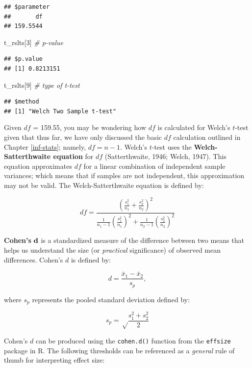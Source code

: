 \documentclass[]{book}
\newenvironment{Shaded}{\begin{snugshade}}{\end{snugshade}}
\newcommand{\CommentTok}[1]{\textcolor[rgb]{0.56,0.35,0.01}{\textit{#1}}}
\newcommand{\DecValTok}[1]{\textcolor[rgb]{0.00,0.00,0.81}{#1}}
\newcommand{\NormalTok}[1]{#1}
\begin{document}
\begin{verbatim}
## $parameter
##       df 
## 159.5544
\end{verbatim}

\begin{Shaded}
\begin{Highlighting}[]
\NormalTok{t_rslts[}\DecValTok{3}\NormalTok{] }\CommentTok{# p-value}
\end{Highlighting}
\end{Shaded}

\begin{verbatim}
## $p.value
## [1] 0.8213151
\end{verbatim}

\begin{Shaded}
\begin{Highlighting}[]
\NormalTok{t_rslts[}\DecValTok{9}\NormalTok{] }\CommentTok{# type of t-test}
\end{Highlighting}
\end{Shaded}

\begin{verbatim}
## $method
## [1] "Welch Two Sample t-test"
\end{verbatim}

Given \(df\) = 159.55, you may be wondering how \(df\) is calculated for Welch's \(t\)-test given that thus far, we have only discussed the basic \(df\) calculation outlined in Chapter \ref{inf-stats}; namely, \(df = n - 1\). Welch's \(t\)-test uses the \textbf{Welch-Satterthwaite equation} for \(df\) (Satterthwaite, 1946; Welch, 1947). This equation approximates \(df\) for a linear combination of independent sample variances; which means that if samples are not independent, this approximation may not be valid. The Welch-Satterthwaite equation is defined by:

\[ df = \frac {(\frac{s^2_1}{n_1} + \frac{s^2_2}{n_2})^2} {\frac{1}{n_1 - 1} (\frac{s^2_1}{n_1})^2 + \frac{1}{n_2 - 1} (\frac{s^2_2}{n_2})^2} \]

\textbf{Cohen's} \(\textbf d\) is a standardized measure of the difference between two means that helps us understand the size (or \emph{practical} significance) of observed mean differences. Cohen's \(d\) is defined by:

\[ d = \frac{\bar{x}_1 - \bar{x}_2} {s_p},  \]

where \(s_p\) represents the pooled standard deviation defined by:

\[ s_p = \sqrt\frac{s^2_1 + s^2_2}{2} \]

Cohen's \(d\) can be produced using the \texttt{cohen.d()} function from the \texttt{effsize} package in R. The following thresholds can be referenced as a \emph{general} rule of thumb for interpreting effect size:
\end{document}

